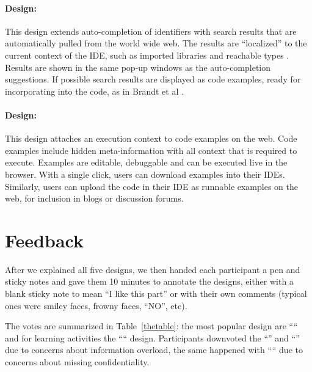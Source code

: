\moarsauce
\paragraph{Design: \RichIntellisense} 
This design extends auto-completion of identifiers with search results that are automatically pulled from the world wide web. The results are ``localized'' to the current context of the IDE, such as imported libraries and reachable types \cite{Holmes2005}. Results are shown in the same pop-up windows as the auto-completion suggestions. If possible search results are displayed as code examples, ready for incorporating into the code, as in Brandt et al \cite{bdwk10}.

\moarsauce
\paragraph{Design: \CloudREPL} 
This design attaches an execution context to code examples on the web. Code examples include hidden meta-information with all context that is required to execute. Examples are editable, debuggable and can be executed live in the browser. With a single click, users can download examples into their IDEs. Similarly, users can upload the code in their IDE as runnable examples on the web, for inclusion in blogs or discussion forums.

\moarsauce
\section{Feedback}

After we explained all five designs, we then handed each participant a pen and sticky notes and gave them 10 minutes to annotate the designs, either with a blank sticky note to mean ``I like this part'' or with their own comments (typical ones were smiley faces, frowny faces, ``NO'', etc). 

The votes are summarized in Table~\ref{thetable}: the most popular design are ``\FacettedSearch`` and for learning activities the ``\ConceptMap`` design. Participants downvoted the ``\ZoomableUML'' and ``\RichIntellisense'' due to concerns about information overload, the same happened with ``\CloudREPL`` due to concerns about missing confidentiality.

